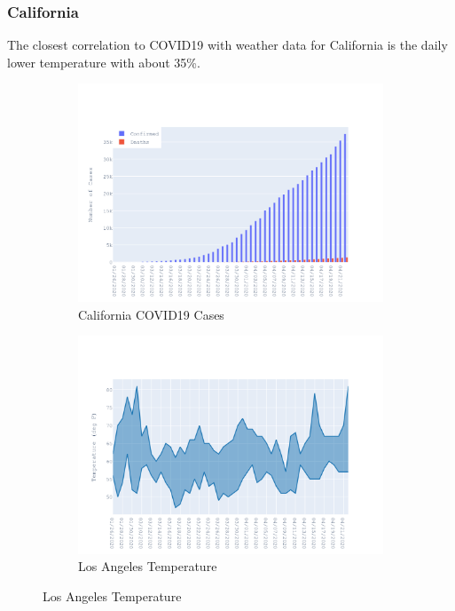 \documentclass{homework}
\begin{document}
\newpage
\subsubsection{California}

The closest correlation to COVID19 with weather data for California is the daily lower temperature with about 35\%.

\begin{figure}[H]
  \centering
  \begin{subfigure}{0.45\linewidth}
    \includegraphics[width=\linewidth]{task4/California_cases.png}
    \caption{California COVID19 Cases}
  \end{subfigure}
  \hfil
  \begin{subfigure}{0.45\linewidth}
    \includegraphics[width=\linewidth]{task4/California_temp.png}
    \caption{Los Angeles Temperature}
  \end{subfigure}


\end{figure}
\end{document}

